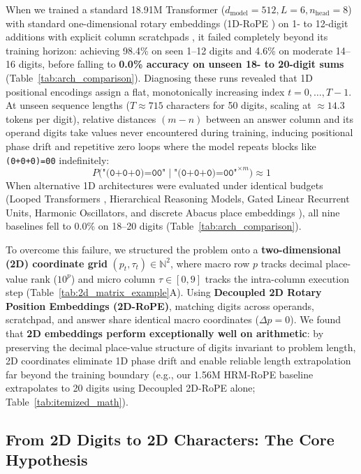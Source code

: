\documentclass[10pt,twocolumn]{article}
\begin{document}
When we trained a standard 18.91M Transformer ($d_{\text{model}}=512, L=6, n_{\text{head}}=8$) with standard one-dimensional rotary embeddings (1D-RoPE \cite{su2024roformer,kazemnejad2023impact}) on 1- to 12-digit additions with explicit column scratchpads \cite{nye2021show,wei2022chain}, it failed completely beyond its training horizon: achieving 98.4\% on seen 1--12 digits and 4.6\% on moderate 14--16 digits, before falling to \textbf{0.0\% accuracy on unseen 18- to 20-digit sums} (Table~\ref{tab:arch_comparison}). Diagnosing these runs revealed that 1D positional encodings assign a flat, monotonically increasing index $t = 0, \dots, T-1$. At unseen sequence lengths ($T \approx 715$ characters for 50 digits, scaling at $\approx 14.3$ tokens per digit), relative distances $(m - n)$ between an answer column and its operand digits take values never encountered during training, inducing positional phase drift and repetitive zero loops where the model repeats blocks like \texttt{(0+0+0)=00} indefinitely:
\begin{equation}
P\big(\texttt{"(0+0+0)=00"} \;\big|\; \texttt{"(0+0+0)=00"}^{\times m}\big) \approx 1
\end{equation}
When alternative 1D architectures were evaluated under identical budgets (Looped Transformers \cite{dehghani2018universal,giannou2023looped}, Hierarchical Reasoning Models, Gated Linear Recurrent Units, Harmonic Oscillators, and discrete Abacus place embeddings \cite{mcleish2024transformers}), all nine baselines fell to 0.0\% on 18--20 digits (Table~\ref{tab:arch_comparison}).

To overcome this failure, we structured the problem onto a \textbf{two-dimensional (2D) coordinate grid} $(p_t, \tau_t) \in \mathbb{N}^2$, where macro row $p$ tracks decimal place-value rank ($10^p$) and micro column $\tau \in [0, 9]$ tracks the intra-column execution step (Table~\ref{tab:2d_matrix_example}A). Using \textbf{Decoupled 2D Rotary Position Embeddings (2D-RoPE)}, matching digits across operands, scratchpad, and answer share identical macro coordinates ($\Delta p = 0$). We found that \textbf{2D embeddings perform exceptionally well on arithmetic}: by preserving the decimal place-value structure of digits invariant to problem length, 2D coordinates eliminate 1D phase drift and enable reliable length extrapolation far beyond the training boundary (e.g., our 1.56M HRM-RoPE baseline extrapolates to 20 digits using Decoupled 2D-RoPE alone; Table~\ref{tab:itemized_math}).

\subsection{From 2D Digits to 2D Characters: The Core Hypothesis}
\label{sec:char_hypothesis}
\end{document}
